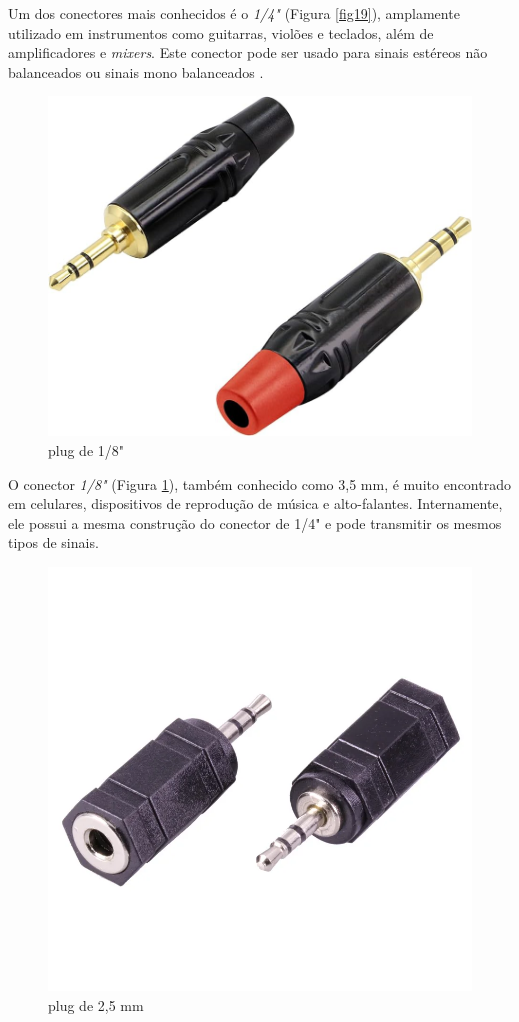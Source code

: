 Um dos conectores mais conhecidos é o \textit{1/4"} (Figura \ref{fig19}), amplamente utilizado em instrumentos como guitarras, violões e teclados, além de amplificadores e \textit{mixers}. Este conector pode ser usado para sinais estéreos não balanceados ou sinais mono balanceados \cite{bartlett}.

\begin{figure}[h]
	\centering
    \includegraphics[scale=0.2]{figuras/fig20.png}
	\caption{plug de 1/8" \cite{mouser}}
	\label{fig20}
\end{figure}

O conector \textit{1/8"} (Figura \ref{fig20}), também conhecido como 3,5 mm, é muito encontrado em celulares, dispositivos de reprodução de música e alto-falantes. Internamente, ele possui a mesma construção do conector de 1/4" e pode transmitir os mesmos tipos de sinais.

\begin{figure}[h]
	\centering
    \includegraphics[scale=0.2]{figuras/fig21.png}
	\caption{plug de 2,5 mm \cite{mouser}}
	\label{fig21}
\end{figure}

